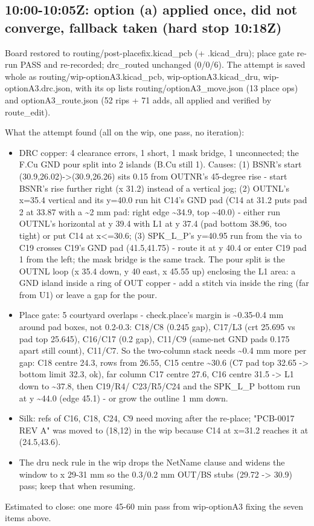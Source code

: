 \documentclass[11pt]{article}
\begin{document}
\subsection*{10:00-10:05Z: option (a) applied once, did not converge, fallback taken (hard stop 10:18Z)}
Board restored to routing/post-placefix.kicad\_pcb (+ .kicad\_dru); place gate re-run PASS and re-recorded; drc\_routed unchanged (0/0/6). The attempt is saved whole as routing/wip-optionA3.kicad\_pcb, wip-optionA3.kicad\_dru, wip-optionA3.drc.json, with its op lists routing/optionA3\_move.json (13 place ops) and optionA3\_route.json (52 rips + 71 adds, all applied and verified by route\_edit).

What the attempt found (all on the wip, one pass, no iteration):

\begin{itemize}
\item DRC copper: 4 clearance errors, 1 short, 1 mask bridge, 1 unconnected; the F.Cu GND pour split
into 2 islands (B.Cu still 1). Causes: (1) BSNR's start (30.9,26.02)-\textgreater{}(30.9,26.26) sits 0.15 from
OUTNR's 45-degree rise - start BSNR's rise further right (x 31.2) instead of a vertical jog;
(2) OUTNL's x=35.4 vertical and its y=40.0 run hit C14's GND pad (C14 at 31.2 puts pad 2 at 33.87
with a \textasciitilde{}2 mm pad: right edge \textasciitilde{}34.9, top \textasciitilde{}40.0) - either run OUTNL's horizontal at y 39.4 with L1
at y 37.4 (pad bottom 38.96, too tight) or put C14 at x\textless{}=30.6; (3) SPK\_L\_P's y=40.95 run from the
via to C19 crosses C19's GND pad (41.5,41.75) - route it at y 40.4 or enter C19 pad 1 from the
left; the mask bridge is the same track. The pour split is the OUTNL loop (x 35.4 down, y 40 east,
x 45.55 up) enclosing the L1 area: a GND island inside a ring of OUT copper - add a stitch via
inside the ring (far from U1) or leave a gap for the pour.
\item Place gate: 5 courtyard overlaps - check.place's margin is \textasciitilde{}0.35-0.4 mm around pad boxes, not
0.2-0.3: C18/C8 (0.245 gap), C17/L3 (crt 25.695 vs pad top 25.645), C16/C17 (0.2 gap),
C11/C9 (same-net GND pads 0.175 apart still count), C11/C7. So the two-column stack needs \textasciitilde{}0.4 mm
more per gap: C18 centre 24.3, rows from 26.55, C15 centre \textasciitilde{}30.6 (C7 pad top 32.65 -\textgreater{} bottom
limit 32.3, ok), far column C17 centre 27.6, C16 centre 31.5 -\textgreater{} L1 down to \textasciitilde{}37.8, then C19/R4/
C23/R5/C24 and the SPK\_L\_P bottom run at y \textasciitilde{}44.0 (edge 45.1) - or grow the outline 1 mm down.
\item Silk: refs of C16, C18, C24, C9 need moving after the re-place; "PCB-0017 REV A" was moved to
(18,12) in the wip because C14 at x=31.2 reaches it at (24.5,43.6).
\item The dru neck rule in the wip drops the NetName clause and widens the window to x 29-31 mm so
the 0.3/0.2 mm OUT/BS stubs (29.72 -\textgreater{} 30.9) pass; keep that when resuming.
\end{itemize}
Estimated to close: one more 45-60 min pass from wip-optionA3 fixing the seven items above.
\end{document}
